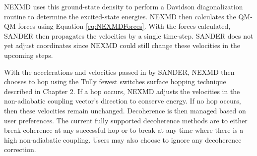 NEXMD uses this ground-state density to perform a Davidson
diagonalization routine to determine the excited-state
energies. NEXMD then calculates the QM-QM forces using Equation
\ref{eq:NEXMDForces}. With the forces calculated, SANDER then
propagates the velocities by a single time-step. SANDER does not
yet adjust coordinates since NEXMD could still change these
velocities in the upcoming steps.

With the accelerations and velocities passed in by SANDER, NEXMD
then chooses to hop using the Tully fewest switches surface
hopping technique described in Chapter 2. If a hop occurs, NEXMD
adjusts the velocities in the non-adiabatic coupling vector’s
direction to conserve energy. If no hop occurs, then these
velocities remain unchanged.  Decoherence is then managed based
on user preferences. The current fully supported decoherence
methods are to either break coherence at any successful hop or to break at
any time where there is a high non-adiabatic coupling. Users may
also choose to ignore any decoherence correction.

